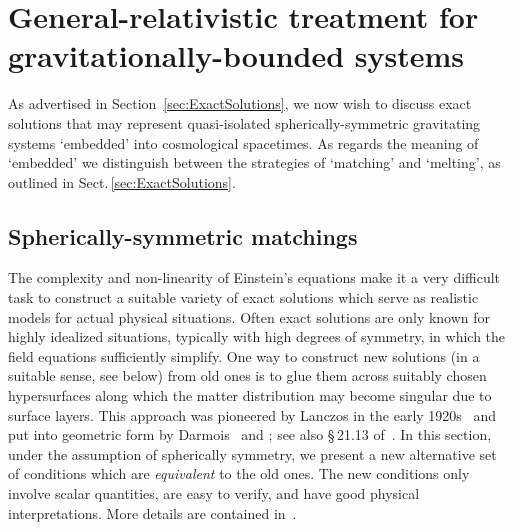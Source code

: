 \documentclass
[rmp,aps,twocolumn,showpacs,preprintnumbers,amsmath,amssymb]{revtex4}
\theoremstyle{plain}
\theoremstyle{definition}
\theoremstyle{remark}
\begin{document}
\section{General-relativistic treatment for gravitationally-bounded systems}
\label{sec:McVittie}
%
As advertised in Section~\ref{sec:ExactSolutions}, we now wish to discuss 
exact solutions that may represent quasi-isolated spherically-symmetric 
gravitating systems `embedded' into cosmological spacetimes. As regards 
the meaning of `embedded' we distinguish between the strategies of 
`matching' and `melting', as outlined in Sect.\,\ref{sec:ExactSolutions}. 


\subsection{Spherically-symmetric matchings}
\label{sec:spher-symm-match}
%
The complexity and non-linearity of Einstein's equations make it 
a very difficult task to construct a suitable variety of exact 
solutions which serve as realistic models for actual physical 
situations. Often exact solutions are only known for highly 
idealized situations, typically with high degrees of symmetry, 
in which the field equations sufficiently simplify. One way to 
construct new solutions (in a suitable sense, see below) from 
old ones is to glue them across suitably chosen hypersurfaces 
along which the matter distribution may become singular due to 
surface layers. This approach was pioneered by Lanczos in the 
early 1920s~\cite{Lanczos:1924} and put into geometric form 
by Darmois~\cite{Darmois:1927} and \cite{Israel:1966}; see 
also \S\,21.13 of~\cite{Misner.Thorne.Wheeler:Gravitation}. 
In this section, under the assumption of spherically symmetry, 
we present a new alternative set of conditions which are 
\emph{equivalent} to the old ones. The new conditions only
involve scalar quantities, are easy to verify, and have good 
physical interpretations. More details are contained 
in~\cite{Carrera:2009}.
\end{document}
